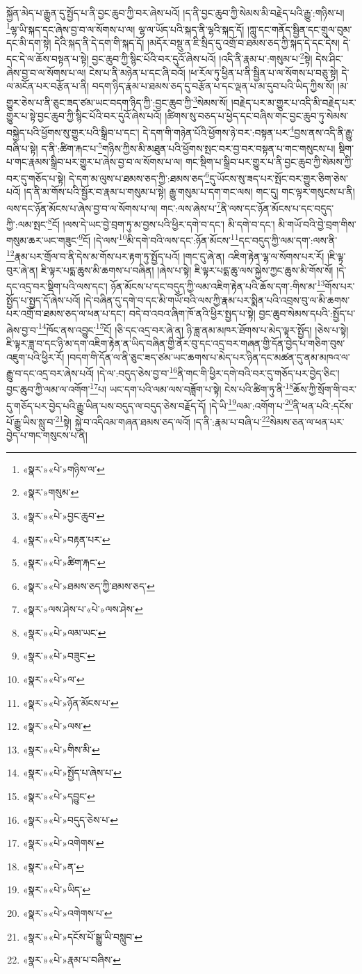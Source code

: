 སྐྱོན་མེད་པ་རྒྱུན་དུ་སྤྱོད་པ་ནི་བྱང་ཆུབ་ཀྱི་བར་ཞེས་པའོ། །ད་ནི་བྱང་ཆུབ་ཀྱི་སེམས་མི་བརྗེད་པའི་རྒྱུ་:གཉིས་པ། \footnote{«སྣར་»«པེ་»གཉིས་ལ་}ལྷ་ཡི་སྐད་དང་ཞེས་བྱ་བ་ལ་སོགས་པ་ལ། ལྷ་ལ་ཡོད་པའི་སྐད་ནི་ལྷའི་སྐད་དོ། །ཀླུ་དང་གནོད་སྦྱིན་དང་གྲུལ་བུམ་དང་མི་དག་སྟེ། དེའི་སྐད་ནི་དེ་དག་གི་སྐད་དོ། །མདོར་བསྡུ་ན་ཇི་སྲིད་དུ་འགྲོ་བ་ཐམས་ཅད་ཀྱི་སྐད་དེ་དང་དེས། དེ་དང་དེ་ལ་ཆོས་བསྟན་པ་སྟེ། བྱང་ཆུབ་ཀྱི་སྙིང་པོའི་བར་དུའོ་ཞེས་པའོ། །འདི་ནི་རྣམ་པ་:གསུམ་པ་\footnote{«སྣར་»གསུམ་}སྟེ། དེས་ཤིང་ཞེས་བྱ་བ་ལ་སོགས་པ་ལ། ངེས་པ་ནི་མཉེན་པ་དང་ཞི་བའོ། །ཕ་རོལ་ཏུ་ཕྱིན་པ་ནི་སྦྱིན་པ་ལ་སོགས་པ་བཅུ་སྟེ། དེ་ལ་མངོན་པར་བརྩོན་པ་ནི། བདག་ཉིད་རྣམ་པ་ཐམས་ཅད་དུ་བརྩོན་པ་དང་ལྡན་པ་མ་དུབ་པའི་ཡིད་ཀྱིས་སོ། །མ་གྱུར་ཅེས་པ་ནི་ཅུང་ཟད་ཙམ་ཡང་བདག་ཉིད་ཀྱི་:བྱང་ཆུབ་ཀྱི་\footnote{«སྣར་»«པེ་»བྱང་ཆུབ་}སེམས་སོ། །བརྗེད་པར་མ་གྱུར་པ་འདི་མི་བརྗེད་པར་གྱུར་པ་སྟེ་བྱང་ཆུབ་ཀྱི་སྙིང་པོའི་བར་དུའོ་ཞེས་པའོ། །ཚིགས་སུ་བཅད་པ་ཕྱེད་དང་བཞིས་གང་བྱང་ཆུབ་ཏུ་སེམས་བསྐྱེད་པའི་ཕྱོགས་སུ་གྱུར་པའི་སྒྲིབ་པ་དང་། དེ་དག་གི་གཉེན་པོའི་ཕྱོགས་ཉེ་བར་:བསྟན་པར་\footnote{«སྣར་»«པེ་»བརྟན་པར་}བྱས་ནས་འདི་ནི་རྒྱུ་བཞི་པ་སྟེ། ད་ནི་:ཚིག་རྐང་པ་\footnote{«སྣར་»«པེ་»ཚིག་རྐང་}གཉིས་ཀྱིས་མི་མཐུན་པའི་ཕྱོགས་སྤང་བར་བྱ་བར་བསྟན་པ་གང་གསུངས་པ། སྡིག་པ་གང་རྣམས་སྒྲིབ་པར་གྱུར་པ་ཞེས་བྱ་བ་ལ་སོགས་པ་ལ། གང་སྡིག་པ་སྒྲིབ་པར་གྱུར་པ་ནི་བྱང་ཆུབ་ཀྱི་སེམས་ཀྱི་བར་དུ་གཅོད་པ་སྟེ། དེ་དག་མ་ལུས་པ་ཐམས་ཅད་ཀྱི་:ཐམས་ཅད་\footnote{«སྣར་»«པེ་»ཐམས་ཅད་ཀྱི་ཐམས་ཅད་}དུ་ཡོངས་སུ་ཟད་པར་སྤོང་བར་གྱུར་ཅིག་ཅེས་པའོ། །ད་ནི་མ་གོས་པའི་སྦྱོར་བ་རྣམ་པ་གསུམ་པ་སྟེ། རྒྱུ་གསུམ་པ་དག་གང་ལས། གང་དུ། གང་ལྟར་གསུངས་པ་ནི། ལས་དང་ཉོན་མོངས་པ་ཞེས་བྱ་བ་ལ་སོགས་པ་ལ། གང་:ལས་ཞེས་པ་\footnote{«སྣར་»ལས་ཤེས་པ་«པེ་»ལས་ཤེས་}ནི་ལས་དང་ཉོན་མོངས་པ་དང་བདུད་ཀྱི་:ལམ་སྤང་\footnote{«སྣར་»«པེ་»ལམ་ཡང་}ངོ། །ལས་དེ་ཡང་བྱེ་བྲག་ཏུ་མ་བྱས་པའི་ཕྱིར་དགེ་བ་དང་། མི་དགེ་བ་དང་། མི་གཡོ་བའི་བྱེ་བྲག་གིས་གསུམ་ཆར་ཡང་གཟུང་\footnote{«སྣར་»«པེ་»བཟུང་}ངོ། །དེ་ལས་\footnote{«སྣར་»«པེ་»ལ་}མི་དགེ་བའི་ལས་དང་:ཉོན་མོངས་\footnote{«སྣར་»«པེ་»ཉོན་མོངས་པ་}དང་བདུད་ཀྱི་ལམ་དག་:ལས་ནི་\footnote{«སྣར་»«པེ་»ལས་}རྣམ་པར་གྲོལ་བ་ནི་དེས་མ་གོས་པར་རྟག་ཏུ་སྤྱོད་པའོ། །གང་དུ་ཞེ་ན། འཇིག་རྟེན་ལྷ་ལ་སོགས་པར་རོ། །ཇི་ལྟ་བུར་ཞེ་ན། ཇི་ལྟར་པདྨ་ཆུས་མི་ཆགས་པ་བཞིན། །ཞེས་པ་སྟེ། ཇི་ལྟར་པདྨ་ཆུ་ལས་སྐྱེས་ཀྱང་ཆུས་མི་གོས་སོ། །དེ་དང་འདྲ་བར་སྡིག་པའི་ལས་དང་། ཉོན་མོངས་པ་དང་བདུད་ཀྱི་ལམ་འཇིག་རྟེན་པའི་ཆོས་དག་:གིས་མ་\footnote{«སྣར་»«པེ་»གིས་མི་}གོས་པར་སྤྱོད་པ་སྤྱད་དོ་ཞེས་པའོ། །དེ་བཞིན་དུ་དགེ་བ་དང་མི་གཡོ་བའི་ལས་ཀྱི་རྣམ་པར་སྨིན་པའི་འབྲས་བུ་ལ་མི་ཆགས་པར་འགྲོ་བ་ཐམས་ཅད་ལ་ཕན་པ་དང་། བདེ་བ་འབའ་ཞིག་ཁོ་ནའི་ཕྱིར་སྤྱད་པ་སྟེ། བྱང་ཆུབ་སེམས་དཔའི་:སྤྱོད་པ་ཞེས་བྱ་བ་\footnote{«སྣར་»«པེ་»སྤྱོད་པ་ཞེས་པ་}ཁོང་ནས་འབྱུང་\footnote{«སྣར་»«པེ་»དབྱུང་}ངོ། །ཅི་དང་འདྲ་བར་ཞེ་ན། ཉི་ཟླ་ནམ་མཁར་ཐོགས་པ་མེད་ལྟར་སྤྱོད། །ཅེས་པ་སྟེ། ཇི་ལྟར་ཟླ་བ་དང་ཉི་མ་དག་འཇིག་རྟེན་ན་ཡིད་བཞིན་གྱི་ནོར་བུ་དང་འདྲ་བར་གཞན་གྱི་དོན་བྱེད་པ་གཅིག་བུས་འཇུག་པའི་ཕྱིར་རོ། །བདག་གི་དོན་ལ་ནི་ཅུང་ཟད་ཙམ་ཡང་ཆགས་པ་མེད་པར་ཉིན་དང་མཚན་དུ་ནམ་མཁའ་ལ་རྒྱུ་བ་དང་འདྲ་བར་ཞེས་པའོ། །དེ་ལ་:བདུད་ཅེས་བྱ་བ་\footnote{«སྣར་»«པེ་»བདུད་ཅེས་པ་}ནི་གང་གི་ཕྱིར་དགེ་བའི་བར་དུ་གཅོད་པར་བྱེད་ཅིང་། བྱང་ཆུབ་ཀྱི་ལམ་ལ་འགོག་\footnote{«སྣར་»«པེ་»འགེགས་}པ། ཡང་དག་པའི་ལམ་ལས་བཟློག་པ་སྟེ། ངེས་པའི་ཚིག་ཏུ་ནི་\footnote{«སྣར་»«པེ་»ན་}ཆོས་ཀྱི་སྲོག་གི་བར་དུ་གཅོད་པར་བྱེད་པའི་རྒྱུ་ཡིན་པས་བདུད་ལ་བདུད་ཅེས་བརྗོད་དོ། །དེ་ཡི་\footnote{«སྣར་»«པེ་»ཡིད་}ལམ་:འགོག་པ་\footnote{«སྣར་»«པེ་»འགེགས་པ་}ནི་ཕན་པའི་:དངོས་པོ་རྒྱུ་ཡིས་སླུ་བ་\footnote{«སྣར་»«པེ་»དངོས་པོ་སྒྱུ་ཡི་བསླུབ་}སྟེ། སྐྱེ་བ་འདིའམ་གཞན་ཐམས་ཅད་ལའོ། །ད་ནི་:རྣམ་པ་བཞི་པ་\footnote{«སྣར་»«པེ་»རྣམ་པ་བཞིས་}སེམས་ཅན་ལ་ཕན་པར་བྱེད་པ་གང་གསུངས་པ་ནི། 